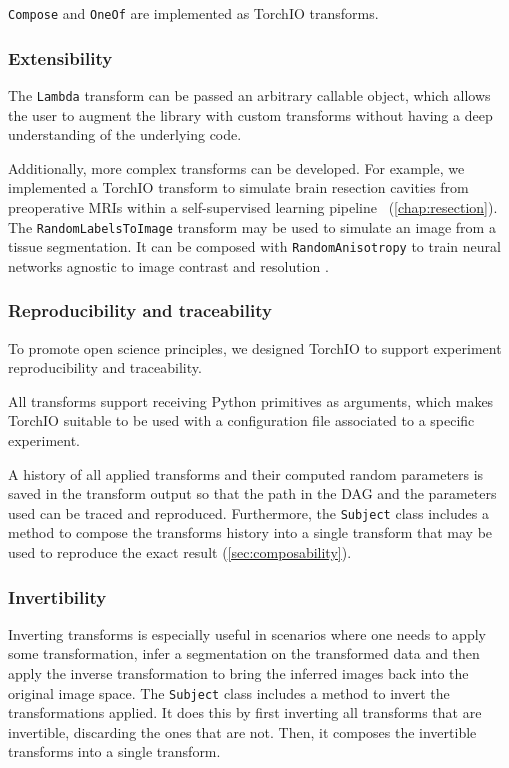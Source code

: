 \texttt{Compose} and \texttt{OneOf} are implemented as TorchIO
transforms.


\subsubsection{Extensibility}

The \texttt{Lambda} transform can be passed an arbitrary callable object, which allows the user to augment the library with custom transforms without having a deep understanding of the underlying code.

Additionally, more complex transforms can be developed.
For example, we implemented a TorchIO transform to simulate brain resection cavities from preoperative \acp{MRI} within a self-supervised learning pipeline~\cite{perez-garcia_simulation_2020} (\cref{chap:resection}).
The \texttt{RandomLabelsToImage} transform may be used to simulate an image from a tissue segmentation.
It can be composed with \texttt{RandomAnisotropy} to train neural networks agnostic to image contrast and resolution \cite{billot_learning_2020,billot_partial_2020,iglesias_joint_2020}.


\subsubsection{Reproducibility and traceability}

To promote open science principles, we designed TorchIO to support experiment reproducibility and traceability.

All transforms support receiving Python primitives as arguments, which makes TorchIO suitable to be used with a configuration file associated to a specific experiment.

A history of all applied transforms and their computed random parameters is saved in the transform output so that the path in the \ac{DAG} and the parameters used can be traced and reproduced.
Furthermore, the \texttt{Subject} class includes a method to compose the transforms history into a single transform that may be used to reproduce the exact result (\cref{sec:composability}).


\subsubsection{Invertibility}

Inverting transforms is especially useful in scenarios where one needs to apply some transformation, infer a segmentation on the transformed data and then apply the inverse transformation to bring the inferred images back into the original image space.
The \texttt{Subject} class includes a method to invert the transformations applied.
It does this by first inverting all transforms that are invertible, discarding the ones that are not.
Then, it composes the invertible transforms into a single transform.

